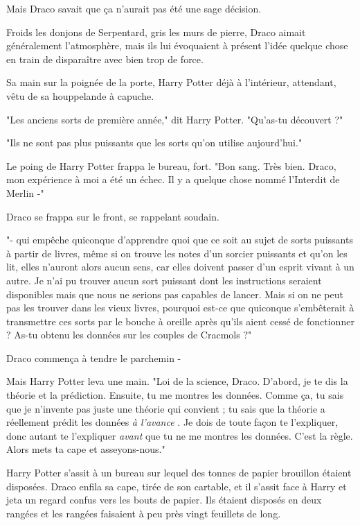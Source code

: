 Mais Draco savait que ça n'aurait pas été une sage décision.

Froids les donjons de Serpentard, gris les murs de pierre, Draco aimait généralement l'atmosphère, mais ils lui évoquaient à présent l'idée quelque chose en train de disparaître avec bien trop de force.

Sa main sur la poignée de la porte, Harry Potter déjà à l'intérieur, attendant, vêtu de sa houppelande à capuche.

"Les anciens sorts de première année," dit Harry Potter. "Qu'as-tu découvert ?"

"Ils ne sont pas plus puissants que les sorts qu'on utilise aujourd'hui."

Le poing de Harry Potter frappa le bureau, fort. "Bon sang. Très bien. Draco, mon expérience à moi a été un échec. Il y a quelque chose nommé l'Interdit de Merlin -"

Draco se frappa sur le front, se rappelant soudain.

"- qui empêche quiconque d'apprendre quoi que ce soit au sujet de sorts puissants à partir de livres, même si on trouve les notes d'un sorcier puissants et qu'on les lit, elles n'auront alors aucun sens, car elles doivent passer d'un esprit vivant à un autre. Je n'ai pu trouver aucun sort puissant dont les instructions seraient disponibles mais que nous ne serions pas capables de lancer. Mais si on ne peut pas les trouver dans les vieux livres, pourquoi est-ce que quiconque s'embêterait à transmettre ces sorts par le bouche à oreille après qu'ils aient cessé de fonctionner ? As-tu obtenu les données sur les couples de Cracmols ?"

Draco commença à tendre le parchemin -

Mais Harry Potter leva une main. "Loi de la science, Draco. D'abord, je te dis la théorie et la prédiction. Ensuite, tu me montres les données. Comme ça, tu sais que je n'invente pas juste une théorie qui convient ; tu sais que la théorie a réellement prédit les données \emph{à l'avance} . Je dois de toute façon te l'expliquer, donc autant te l'expliquer \emph{avant}  que tu ne me montres les données. C'est la règle. Alors mets ta cape et asseyons-nous."

Harry Potter s'assit à un bureau sur lequel des tonnes de papier brouillon étaient disposées. Draco enfila sa cape, tirée de son cartable, et il s'assit face à Harry et jeta un regard confus vers les bouts de papier. Ils étaient disposés en deux rangées et les rangées faisaient à peu près vingt feuillets de long.

